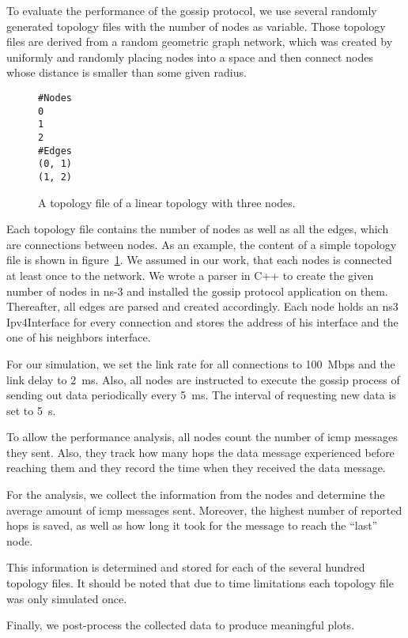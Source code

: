 \documentclass[12pt,journal]{IEEEtran}
\begin{document}
To evaluate the performance of the gossip protocol, we use several randomly generated topology files with the number of nodes as variable. Those topology files are derived from a random geometric graph network, which was created by uniformly and randomly placing nodes into a space and then connect nodes whose distance is smaller than some given radius.

\begin{figure}
 \centering
 \begin{verbatim}#Nodes
0
1
2
#Edges
(0, 1)
(1, 2)\end{verbatim}
 \caption{A topology file of a linear topology with three nodes.}
 \label{fig:topsimple}
\end{figure}


Each topology file contains the number of nodes as well as all the edges, which are connections between nodes. As an example, the content of a simple topology file is shown in figure~\ref{fig:topsimple}. We assumed in our work, that each nodes is connected at least once to the network. We wrote a parser in C++ to create the given number of nodes in ns-3 and installed the gossip protocol application on them. Thereafter, all edges are parsed and created accordingly. Each node holds an ns3 Ipv4Interface for every connection and stores the address of his interface and the one of his neighbors interface.

For our simulation, we set the link rate for all connections to 100~Mbps and the link delay to 2~ms. Also, all nodes are instructed to execute the gossip process of sending out data periodically every 5~ms. The interval of requesting new data is set to 5~s.

To allow the performance analysis, all nodes count the number of icmp messages they sent. Also, they track how many hops the data message experienced before reaching them and they record the time when they received the data message.

For the analysis, we collect the information from the nodes and determine the average amount of icmp messages sent. Moreover, the highest number of reported hops is saved, as well as how long it took for the message to reach the ``last'' node.

This information is determined and stored for each of the several hundred topology files. It should be noted that due to time limitations each topology file was only simulated once.

Finally, we post-process the collected data to produce meaningful plots.
\end{document}
